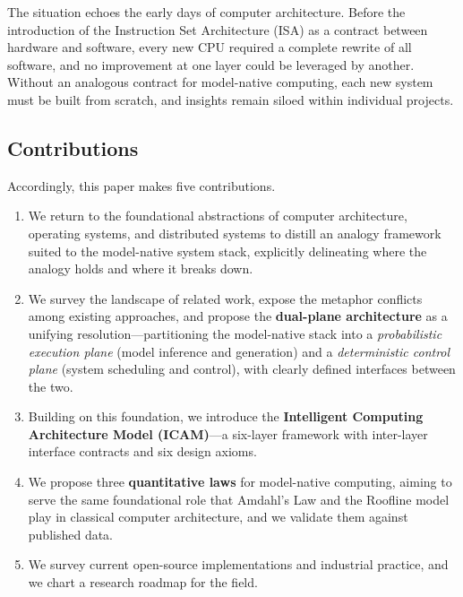 \documentclass[11pt,a4paper]{article}
\newcounter{axiom}[section]
\begin{document}
The situation echoes the early days of computer architecture.
Before the introduction of the Instruction Set Architecture (ISA) as a contract between hardware and software, every new CPU required a complete rewrite of all software, and no improvement at one layer could be leveraged by another.
Without an analogous contract for model-native computing, each new system must be built from scratch, and insights remain siloed within individual projects.

\subsection{Contributions}

Accordingly, this paper makes five contributions.

\begin{enumerate}
\item We return to the foundational abstractions of computer architecture, operating systems, and distributed systems to distill an analogy framework suited to the model-native system stack, explicitly delineating where the analogy holds and where it breaks down.

\item We survey the landscape of related work, expose the metaphor conflicts among existing approaches, and propose the \textbf{dual-plane architecture} as a unifying resolution---partitioning the model-native stack into a \emph{probabilistic execution plane} (model inference and generation) and a \emph{deterministic control plane} (system scheduling and control), with clearly defined interfaces between the two.

\item Building on this foundation, we introduce the \textbf{Intelligent Computing Architecture Model (ICAM)}---a six-layer framework with inter-layer interface contracts and six design axioms.

\item We propose three \textbf{quantitative laws} for model-native computing, aiming to serve the same foundational role that Amdahl's Law and the Roofline model play in classical computer architecture, and we validate them against published data.

\item We survey current open-source implementations and industrial practice, and we chart a research roadmap for the field.
\end{enumerate}
\end{document}

